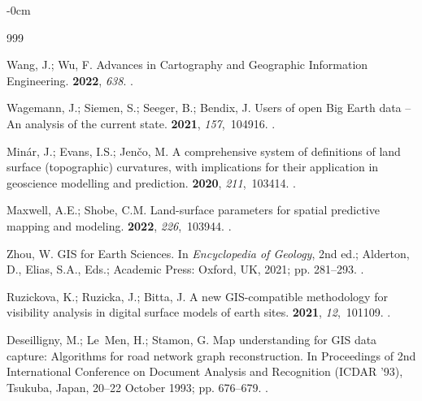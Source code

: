 \documentclass[technologies,article,accept,pdftex,moreauthors]{Definitions/mdpi}
\begin{document}
\begin{adjustwidth}{-\extralength}{0cm}

\begin{thebibliography}{999}
	
	Wang, J.; Wu, F.
	\newblock Advances in Cartography and Geographic Information Engineering.
	 {\bf 2022}, {\em 638}.
	.
	
	Wagemann, J.; Siemen, S.; Seeger, B.; Bendix, J.
	\newblock Users of open Big Earth data – An analysis of the current state.
	 {\bf 2021}, {\em 157},~104916.
	.
	
	Minár, J.; Evans, I.S.; Jenčo, M.
	\newblock A comprehensive system of definitions of land surface (topographic)
	curvatures, with implications for their application in geoscience modelling
	and prediction.
	 {\bf 2020}, {\em 211},~103414.
	.
	
	Maxwell, A.E.; Shobe, C.M.
	\newblock Land-surface parameters for spatial predictive mapping and modeling.
	 {\bf 2022}, {\em 226},~103944.
	.
	
	Zhou, W.
	\newblock GIS for Earth Sciences. In {\em Encyclopedia of Geology}, 2nd ed.;  Alderton, D., Elias, S.A., Eds.; Academic
	Press: Oxford, UK, 2021; pp. 281--293.
	.
	
	Ruzickova, K.; Ruzicka, J.; Bitta, J.
	\newblock A new GIS-compatible methodology for visibility analysis in digital
	surface models of earth sites.
	 {\bf 2021}, {\em 12},~101109.
	.
	
	Deseilligny, M.; Le~Men, H.; Stamon, G.
	\newblock Map understanding for GIS data capture: Algorithms for road network
	graph reconstruction.
	\newblock In Proceedings of 2nd International Conference on
	Document Analysis and Recognition (ICDAR '93), Tsukuba, Japan, 20--22 October %
	1993; pp. 676--679.
	.
	

\end{thebibliography}
\end{adjustwidth}
\end{document}
